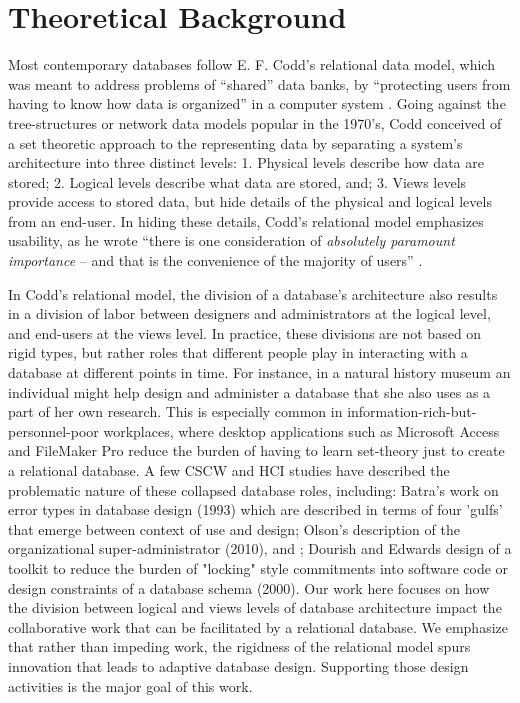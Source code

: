 \section{Theoretical Background}
Most contemporary databases follow E. F. Codd's relational data model, which was meant to address problems of “shared” data banks, by  “protecting users from having to know how data is organized” in a computer system  \cite[p. 377]{Codd_1970}. Going against the tree-structures or network data models popular in the 1970's, Codd conceived of a set theoretic approach to the representing data by separating a system's architecture into three distinct levels: 1. Physical levels describe how data are stored; 2. Logical levels describe what data are stored, and; 3. Views levels provide access to stored data, but hide details of the physical and logical levels from an end-user. In hiding these details, Codd's relational model emphasizes usability, as he wrote “there is one consideration of \emph{absolutely paramount importance} – and that is the convenience of the majority of users” \cite[p.2; emphasis his]{Codd_1971}.

In Codd's relational model, the division of a database's architecture also results in a division of labor between designers and administrators at the logical level, and end-users at the views level. In practice, these divisions are not based on rigid types, but rather roles that different people play in interacting with a database at different points in time. For instance, in a natural history museum an individual might help design and administer a database that she also uses as a part of her own research. This is especially common in information-rich-but-personnel-poor workplaces, where desktop applications such as Microsoft Access and FileMaker Pro reduce the burden of having to learn set-theory just to create a relational database. A few CSCW and HCI studies have described the problematic nature of these collapsed database roles, including: Batra's work on error types in database design (1993) which are described in terms of  four 'gulfs' that emerge between context of use and design; Olson's description of the organizational super-administrator (2010), and ; Dourish and Edwards design of a toolkit to reduce the burden of "locking" style commitments into software code or design constraints of a database schema (2000). Our work here focuses on how the division between logical and views levels of database architecture impact the collaborative work that can be facilitated by a relational database. We emphasize that rather than impeding work, the rigidness of the relational model spurs innovation that leads to adaptive database design. Supporting those design activities is the major goal of this work. 

